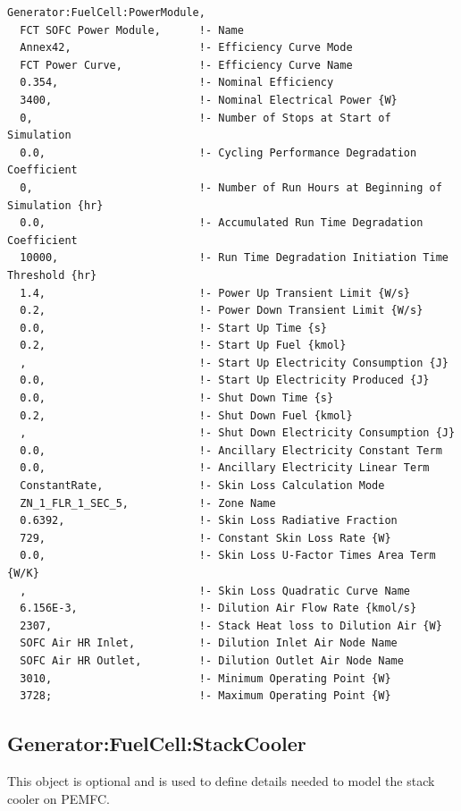 \begin{lstlisting}
Generator:FuelCell:PowerModule,
  FCT SOFC Power Module,      !- Name
  Annex42,                    !- Efficiency Curve Mode
  FCT Power Curve,            !- Efficiency Curve Name
  0.354,                      !- Nominal Efficiency
  3400,                       !- Nominal Electrical Power {W}
  0,                          !- Number of Stops at Start of Simulation
  0.0,                        !- Cycling Performance Degradation Coefficient
  0,                          !- Number of Run Hours at Beginning of Simulation {hr}
  0.0,                        !- Accumulated Run Time Degradation Coefficient
  10000,                      !- Run Time Degradation Initiation Time Threshold {hr}
  1.4,                        !- Power Up Transient Limit {W/s}
  0.2,                        !- Power Down Transient Limit {W/s}
  0.0,                        !- Start Up Time {s}
  0.2,                        !- Start Up Fuel {kmol}
  ,                           !- Start Up Electricity Consumption {J}
  0.0,                        !- Start Up Electricity Produced {J}
  0.0,                        !- Shut Down Time {s}
  0.2,                        !- Shut Down Fuel {kmol}
  ,                           !- Shut Down Electricity Consumption {J}
  0.0,                        !- Ancillary Electricity Constant Term
  0.0,                        !- Ancillary Electricity Linear Term
  ConstantRate,               !- Skin Loss Calculation Mode
  ZN_1_FLR_1_SEC_5,           !- Zone Name
  0.6392,                     !- Skin Loss Radiative Fraction
  729,                        !- Constant Skin Loss Rate {W}
  0.0,                        !- Skin Loss U-Factor Times Area Term {W/K}
  ,                           !- Skin Loss Quadratic Curve Name
  6.156E-3,                   !- Dilution Air Flow Rate {kmol/s}
  2307,                       !- Stack Heat loss to Dilution Air {W}
  SOFC Air HR Inlet,          !- Dilution Inlet Air Node Name
  SOFC Air HR Outlet,         !- Dilution Outlet Air Node Name
  3010,                       !- Minimum Operating Point {W}
  3728;                       !- Maximum Operating Point {W}
\end{lstlisting}

\subsection{Generator:FuelCell:StackCooler}\label{generatorfuelcellstackcooler}

This object is optional and is used to define details needed to model the stack cooler on PEMFC.

